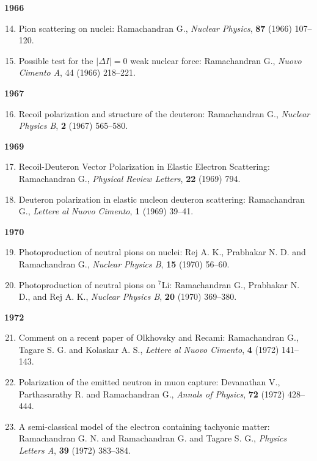 \textbf{1966}
\begin{enumerate}
\setcounter{enumi}{13}
\item Pion scattering on nuclei: Ramachandran G., \textit{Nuclear Physics}, {\bf 87} (1966) 107--120.
\item Possible test for the $|\Delta I|=0$ weak nuclear force: Ramachandran G., \textit{Nuovo Cimento A}, 44 (1966) 218--221.
\end{enumerate}
\textbf{1967}
\begin{enumerate}
\setcounter{enumi}{15}
\item Recoil polarization and structure of the deuteron: Ramachandran G., \textit{Nuclear Physics B}, {\bf 2} (1967) 565--580.
\end{enumerate}
\textbf{1969}
\begin{enumerate}
\setcounter{enumi}{16}
\item Recoil-Deuteron Vector Polarization in Elastic Electron Scattering: Ramachandran G., \textit{Physical Review Letters}, {\bf 22} (1969) 794.
\item Deuteron polarization in elastic nucleon deuteron scattering: Ramachandran G., \textit{Lettere al Nuovo Cimento}, {\bf 1} (1969) 39--41.
\end{enumerate}
\textbf{1970}
\begin{enumerate}
\setcounter{enumi}{18}
\item Photoproduction of neutral pions on nuclei: Rej A. K., Prabhakar N. D. and Ramachandran G., \textit{Nuclear Physics B}, {\bf 15} (1970) 56--60.
\item Photoproduction of neutral pions on $^{7}$Li: Ramachandran G., Prabhakar N. D., and Rej A. K., \textit{Nuclear Physics B}, {\bf 20} (1970) 369--380.
\end{enumerate}
\textbf{1972}
\begin{enumerate}
\setcounter{enumi}{20}
\item Comment on a recent paper of Olkhovsky and Recami: Ramachandran G., Tagare S. G. and Kolaskar A. S., \textit{Lettere al Nuovo Cimento}, {\bf 4} (1972) 141--143.
\item Polarization of the emitted neutron in muon capture: Devanathan V., Parthasarathy R. and Ramachandran G., \textit{Annals of Physics}, {\bf 72} (1972) 428--444.
\item A semi-classical model of the electron containing tachyonic matter: Ramachandran G. N. and Ramachandran G. and Tagare S. G., \textit{Physics Letters A}, {\bf 39} (1972) 383--384.
\end{enumerate}
